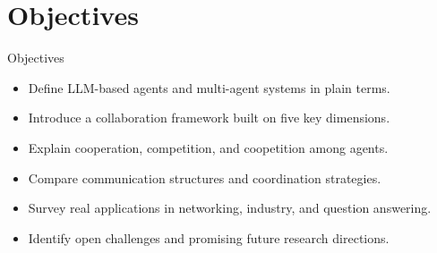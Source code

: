\documentclass[10pt]{beamer}
\begin{document}
\section{Objectives}
\begin{frame}{Objectives}
\begin{itemize}
  \item Define LLM-based agents and multi-agent systems in plain terms.
  \item Introduce a collaboration framework built on five key dimensions.
  \item Explain cooperation, competition, and coopetition among agents.
  \item Compare communication structures and coordination strategies.
  \item Survey real applications in networking, industry, and question answering.
  \item Identify open challenges and promising future research directions.
\end{itemize}
\end{frame}
\end{document}
